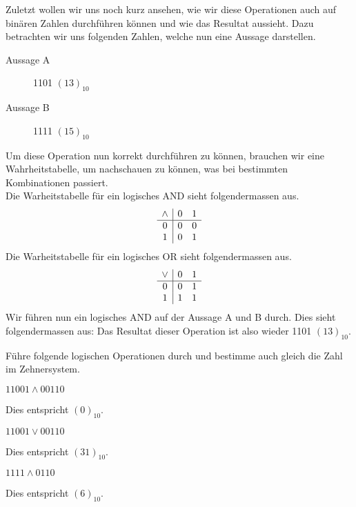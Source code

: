 \newpage
Zuletzt wollen wir uns noch kurz ansehen, wie wir diese Operationen auch auf binären Zahlen durchführen können
und wie das Resultat aussieht. Dazu betrachten wir uns folgenden Zahlen, welche nun eine Aussage darstellen.
\begin{description}
    \item[Aussage A] 1101 $(13)_{10}$
    \item[Aussage B] 1111 $(15)_{10}$
\end{description}
Um diese Operation nun korrekt durchführen zu können, brauchen wir eine Wahrheitstabelle, um nachschauen zu können,
was bei bestimmten Kombinationen passiert.\\
Die Warheitstabelle für ein logisches AND sieht folgendermassen aus.
\[
    \begin{array}{c | c c}
        \land & 0 & 1 \\ \hline
        0 & 0 & 0 \\
        1 & 0 & 1 \\
    \end{array}
\]
Die Warheitstabelle für ein logisches OR sieht folgendermassen aus.
\[
    \begin{array}{c | c c}
        \lor & 0 & 1 \\ \hline
        0 & 0 & 1 \\
        1 & 1 & 1 \\
    \end{array}
\]
Wir führen nun ein logisches AND auf der Aussage A und B durch.
Dies sieht folgendermassen aus:
Das Resultat dieser Operation ist also wieder 1101 $(13)_{10}$.
\newpage
\begin{exerciseseries}[columns=1,solsubrule=\hrule]{}
    Führe folgende logischen Operationen durch und bestimme auch gleich die Zahl im Zehnersystem.
    \begin{exercise}
        $11001 \land 00110$\\
        \vspace{5cm}
    \end{exercise}
    \begin{solution}
        Dies entspricht $(0)_{10}$.
    \end{solution}

    \begin{exercise}
        $11001 \lor 00110$\\
        \vspace{5cm}
    \end{exercise}
    \begin{solution}
        Dies entspricht $(31)_{10}$.
    \end{solution}

    \begin{exercise}
        $1111 \land 0110$\\
        \vspace{5cm}
    \end{exercise}
    \begin{solution}
        Dies entspricht $(6)_{10}$.
    \end{solution}
\end{exerciseseries}

\newpage
\subsection{\solutionsname}
\loadSolutions